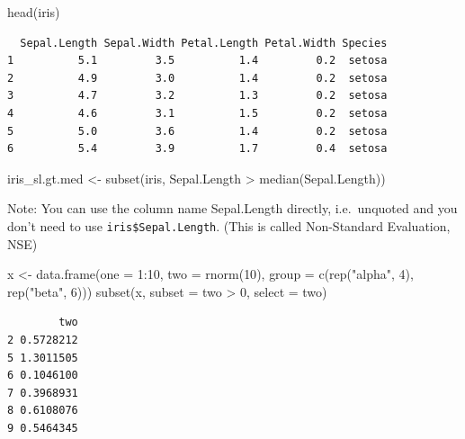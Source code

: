 \documentclass[
]{book}
\newenvironment{Shaded}{\begin{snugshade}}{\end{snugshade}}
\newcommand{\AttributeTok}[1]{\textcolor[rgb]{0.77,0.63,0.00}{#1}}
\newcommand{\DecValTok}[1]{\textcolor[rgb]{0.00,0.00,0.81}{#1}}
\newcommand{\FunctionTok}[1]{\textcolor[rgb]{0.00,0.00,0.00}{#1}}
\newcommand{\NormalTok}[1]{#1}
\newcommand{\OtherTok}[1]{\textcolor[rgb]{0.56,0.35,0.01}{#1}}
\newcommand{\SpecialCharTok}[1]{\textcolor[rgb]{0.00,0.00,0.00}{#1}}
\newcommand{\StringTok}[1]{\textcolor[rgb]{0.31,0.60,0.02}{#1}}
\begin{document}
\begin{Shaded}
\begin{Highlighting}[]
\FunctionTok{head}\NormalTok{(iris)}
\end{Highlighting}
\end{Shaded}

\begin{verbatim}
  Sepal.Length Sepal.Width Petal.Length Petal.Width Species
1          5.1         3.5          1.4         0.2  setosa
2          4.9         3.0          1.4         0.2  setosa
3          4.7         3.2          1.3         0.2  setosa
4          4.6         3.1          1.5         0.2  setosa
5          5.0         3.6          1.4         0.2  setosa
6          5.4         3.9          1.7         0.4  setosa
\end{verbatim}

\begin{Shaded}
\begin{Highlighting}[]
\NormalTok{iris\_sl.gt.med }\OtherTok{\textless{}{-}} \FunctionTok{subset}\NormalTok{(iris, Sepal.Length }\SpecialCharTok{\textgreater{}} \FunctionTok{median}\NormalTok{(Sepal.Length))}
\end{Highlighting}
\end{Shaded}

Note: You can use the column name Sepal.Length directly, i.e.~unquoted and you don't need to use \texttt{iris\$Sepal.Length}. (This is called Non-Standard Evaluation, NSE)

\begin{Shaded}
\begin{Highlighting}[]
\NormalTok{x }\OtherTok{\textless{}{-}} \FunctionTok{data.frame}\NormalTok{(}\AttributeTok{one =} \DecValTok{1}\SpecialCharTok{:}\DecValTok{10}\NormalTok{,}
                \AttributeTok{two =} \FunctionTok{rnorm}\NormalTok{(}\DecValTok{10}\NormalTok{),}
                \AttributeTok{group =} \FunctionTok{c}\NormalTok{(}\FunctionTok{rep}\NormalTok{(}\StringTok{"alpha"}\NormalTok{, }\DecValTok{4}\NormalTok{),  }\FunctionTok{rep}\NormalTok{(}\StringTok{"beta"}\NormalTok{, }\DecValTok{6}\NormalTok{)))}
\FunctionTok{subset}\NormalTok{(x, }\AttributeTok{subset =}\NormalTok{ two }\SpecialCharTok{\textgreater{}} \DecValTok{0}\NormalTok{, }\AttributeTok{select =}\NormalTok{ two)}
\end{Highlighting}
\end{Shaded}

\begin{verbatim}
        two
2 0.5728212
5 1.3011505
6 0.1046100
7 0.3968931
8 0.6108076
9 0.5464345
\end{verbatim}
\end{document}
